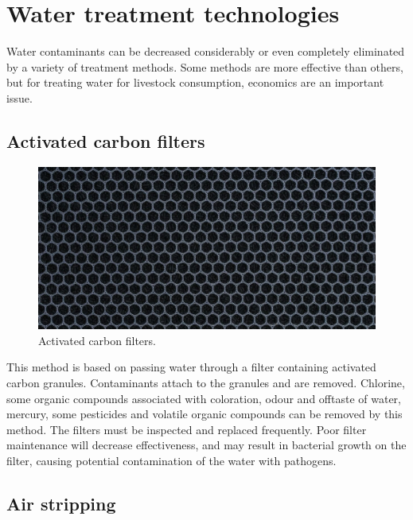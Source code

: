 \documentclass[]{book}
\begin{document}
\section{Water treatment
technologies}\label{water-treatment-technologies}

Water contaminants can be decreased considerably or even completely
eliminated by a variety of treatment methods. Some methods are more
effective than others, but for treating water for livestock consumption,
economics are an important issue.

\subsection{Activated carbon filters}\label{activated-carbon-filters}

\begin{figure}

{\centering \includegraphics[width=1\linewidth,height=1\textheight]{figures/activated-carbon-filter} 

}

\caption{Activated carbon filters.}\label{fig:carbon-filter}
\end{figure}

This method is based on passing water through a filter containing
activated carbon granules. Contaminants attach to the granules and are
removed. Chlorine, some organic compounds associated with coloration,
odour and offtaste of water, mercury, some pesticides and volatile
organic compounds can be removed by this method. The filters must be
inspected and replaced frequently. Poor filter maintenance will decrease
effectiveness, and may result in bacterial growth on the filter, causing
potential contamination of the water with pathogens.

\subsection{Air stripping}\label{air-stripping}
\end{document}
